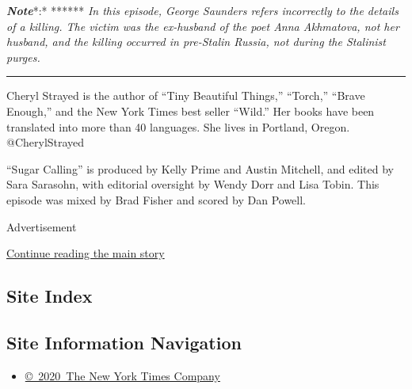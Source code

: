 \emph{\textbf{Note}}*:* ****** \emph{In this episode, George Saunders
refers incorrectly to the details of a killing. The victim was the
ex-husband of the poet Anna Akhmatova, not her husband, and the killing
occurred in pre-Stalin Russia, not during the Stalinist purges.}

\begin{center}\rule{0.5\linewidth}{\linethickness}\end{center}

Cheryl Strayed is the author of ``Tiny Beautiful Things,'' ``Torch,''
``Brave Enough,'' and the New York Times best seller ``Wild.'' Her books
have been translated into more than 40 languages. She lives in Portland,
Oregon. @CherylStrayed

``Sugar Calling'' is produced by Kelly Prime and Austin Mitchell, and
edited by Sara Sarasohn, with editorial oversight by Wendy Dorr and Lisa
Tobin. This episode was mixed by Brad Fisher and scored by Dan Powell.

Advertisement

\protect\hyperlink{after-bottom}{Continue reading the main story}

\hypertarget{site-index}{%
\subsection{Site Index}\label{site-index}}

\hypertarget{site-information-navigation}{%
\subsection{Site Information
Navigation}\label{site-information-navigation}}

\begin{itemize}
\tightlist
\item
  \href{https://help.nytimes.com/hc/en-us/articles/115014792127-Copyright-notice}{©~2020~The
  New York Times Company}
\end{itemize}

